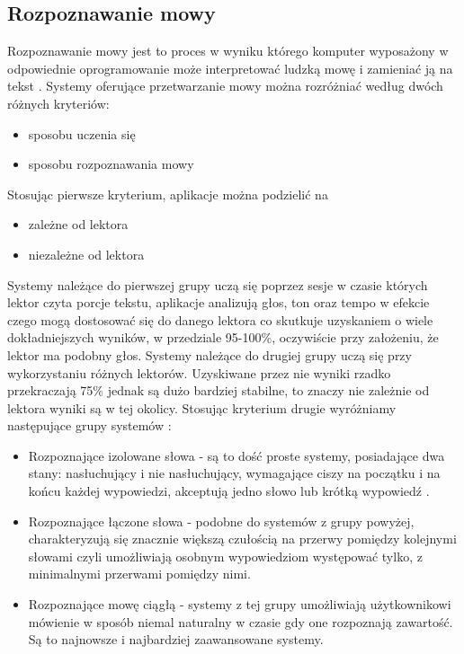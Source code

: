\subsection{Rozpoznawanie mowy}
Rozpoznawanie mowy jest to proces w wyniku którego komputer wyposażony w odpowiednie oprogramowanie może interpretować ludzką mowę i zamieniać ją na tekst \cite{douglas2002}. Systemy oferujące przetwarzanie mowy można rozróżniać	 według dwóch różnych kryteriów:
\begin{itemize}
	\item sposobu uczenia się
	\item sposobu rozpoznawania mowy
\end{itemize}
Stosując pierwsze kryterium, aplikacje można podzielić na
\begin{itemize}
	\item zależne od lektora
	\item niezależne od lektora
\end{itemize}
Systemy należące do pierwszej grupy uczą się poprzez sesje w czasie których lektor czyta porcje tekstu, aplikacje analizują głos, ton oraz tempo  w efekcie czego mogą dostosować się do danego lektora co skutkuje uzyskaniem o wiele dokładniejszych wyników, w przedziale 95-100\%, oczywiście przy założeniu, że lektor ma podobny głos.  Systemy należące do drugiej grupy uczą się przy wykorzystaniu różnych lektorów. Uzyskiwane przez nie wyniki rzadko przekraczają 75\% jednak są dużo bardziej stabilne, to znaczy nie zależnie od lektora wyniki są w tej okolicy. 
Stosując kryterium drugie wyróżniamy następujące grupy systemów \cite{gaikwad2010} :
\begin{itemize}
	\item Rozpoznające izolowane słowa - są to dość proste systemy, posiadające dwa stany: nasłuchujący i nie nasłuchujący,  wymagające ciszy na początku i na końcu każdej wypowiedzi,  akceptują jedno słowo lub krótką wypowiedź .
	\item Rozpoznające łączone słowa - podobne do systemów z grupy powyżej, charakteryzują się znacznie większą czułością na przerwy pomiędzy kolejnymi słowami czyli umożliwiają osobnym wypowiedziom występować tylko, z minimalnymi przerwami pomiędzy nimi.
	\item Rozpoznające mowę ciągłą -  systemy z tej grupy umożliwiają użytkownikowi mówienie w sposób niemal naturalny w czasie gdy one rozpoznają zawartość. Są to najnowsze i najbardziej zaawansowane systemy.
\end{itemize}

